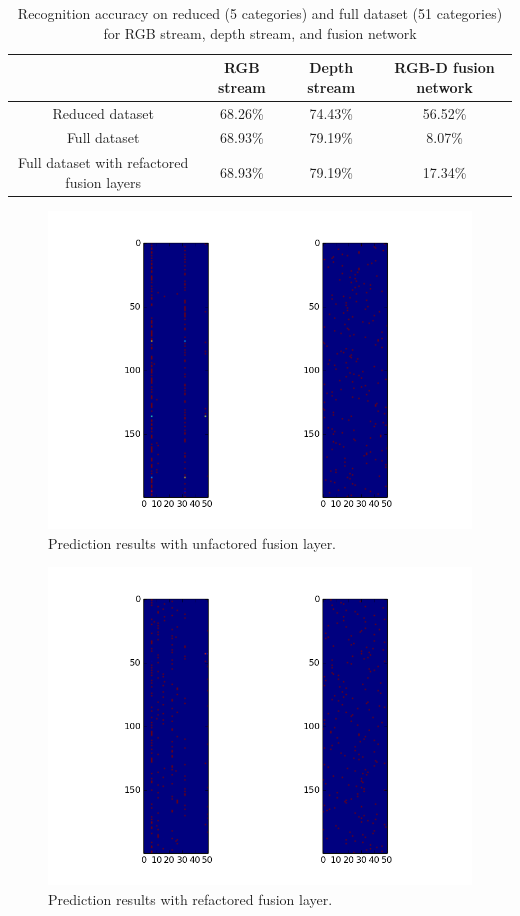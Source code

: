 \begin{table}[htbp]
	\centering
	\caption{Recognition accuracy on reduced (5 categories) and full dataset (51 categories) for RGB stream, depth stream, and fusion network}
	\label{tab:result}
	\begin{tabular}{|c|c|c|c|}
		\hline
		& RGB stream & Depth stream & RGB-D fusion network \\ \hline
		Reduced dataset & 68.26\% & 74.43\% & 56.52\% \\ 
		Full dataset & 68.93\% & 79.19\% & 8.07\% \\ 
		Full dataset with refactored fusion layers & 68.93\% & 79.19\% & 17.34\% \\ \hline
	\end{tabular}
\end{table}

\begin{figure}[htbp]
	\centering
	\includegraphics[width=\textwidth]{img/prediction.png}
	\caption{Prediction results with unfactored fusion layer.}
	\label{fig:prediction}
\end{figure}

\begin{figure}[htbp]
	\centering
	\includegraphics[width=\textwidth]{img/prediction_refactored.png}
	\caption{Prediction results with refactored fusion layer.}
	\label{fig:prediction_refactored}
\end{figure}